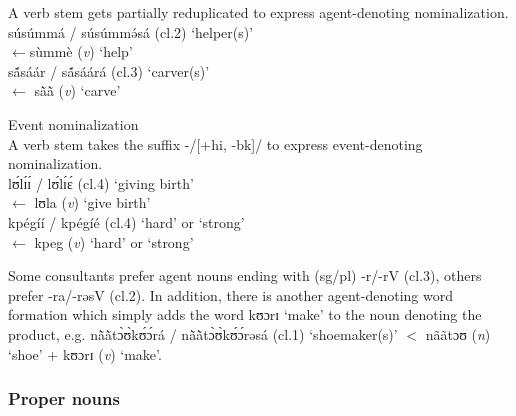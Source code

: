 \begin{exe}
\begin{exe}
\begin{exe}
\begin{exe}
\begin{exe}
\begin{exe}
 \ex\label{exːGRM-der-agent-redup}
{\rm A verb stem gets partially reduplicated  to express
agent-denoting nominalization.}\\
{\sls  súsúmmá} / {\sls súsúmmə́sá} ({\sc cl.2})   {\rm`helper(s)'}\\
 $\leftarrow${\sls sùmmè} ({\it v})  {\rm `help'}\\
{\sls  sã́sáár} / {\sls sã́sáárá} ({\sc cl.3})  {\rm  `carver(s)'}\\
 $\leftarrow$ {\sls sã̀ã̀} ({\it v})  {\rm `carve' }

\z 
 \z


\begin{exe}
 \ex\label{exːGRM-der-action}{\rm Event nominalization}\\
{\rm A verb stem takes the suffix -/[{\sc +hi, -bk}]/   to express
event-denoting
nominalization.}\\
{\sls lʊ́lɪ́ɪ́ } / {\sls  lʊ́lɪ́ɛ́} ({\sc cl.4})  {\rm `giving birth'} \\
 $\leftarrow$ {\sls  lʊla} ({\it v})  {\rm `give birth' } \\
{\sls kpégíí} / {\sls   kpégíé}  ({\sc cl.4})  {\rm  `hard'  or
`strong'} \\
  $\leftarrow$ {\sls  kpeg} ({\it v})  {\rm `hard' or `strong'} \\
\z

Some consultants prefer agent nouns ending with ({\sc sg}/{\sc pl})  {\sls -r/-rV} ({\sc cl.3}),  others prefer  {\sls -ra/-rəsV} ({\sc cl.2}).  In addition, there is another agent-denoting word formation which simply adds the word {\sls kʊɔrɪ} `make' to the noun denoting the product, e.g. {\sls nã̀ã̀tɔ̀ʊ̀kʊ́ɔ́rá} / {\sls nã̀ã̀tɔ̀ʊ̀kʊ́ɔ́rəsá} ({\sc cl.1}) `shoemaker(s)' $<$ {\sls nããtɔʊ} ({\it n}) `shoe' + {\sls kʊɔrɪ} ({\it v}) `make'.


\subsubsection{Proper nouns}
\label{sec:GRM-prop-noun}

% 


\end{exe}
\end{exe}
\end{exe}
\end{exe}
\end{exe}
\end{exe}
\end{exe}
